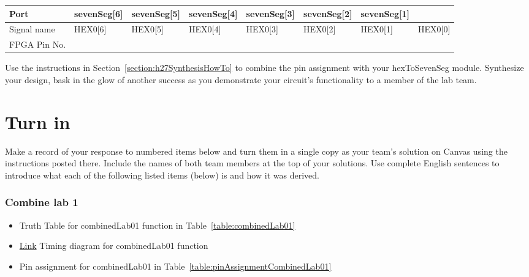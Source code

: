 \begin{longtable}[]{@{}
| >{\raggedright\arraybackslash}p{}|
  >{\raggedright\arraybackslash}p{}|
  >{\raggedright\arraybackslash}p{}|
  >{\raggedright\arraybackslash}p{}|
  >{\raggedright\arraybackslash}p{}|
  >{\raggedright\arraybackslash}p{}|
  >{\raggedright\arraybackslash}p{}|
  >{\raggedright\arraybackslash}p{}|@{}}
\toprule()
Port &
sevenSeg{[}6{]} &
sevenSeg{[}5{]} &
sevenSeg{[}4{]} &
sevenSeg{[}3{]} &
sevenSeg{[}2{]} &
sevenSeg{[}1{]} \\ \hline
\midrule()
\endhead
Signal name & HEX0{[}6{]} & HEX0{[}5{]} & HEX0{[}4{]} & HEX0{[}3{]} &
HEX0{[}2{]} & HEX0{[}1{]} & HEX0{[}0{]} \\ \hline
FPGA Pin No. & & & & & & & \\ \hline
\bottomrule()

\end{longtable}
Use the instructions in Section~\ref{section:h27SynthesisHowTo} to
combine the pin assignment with your hexToSevenSeg module.
Synthesize your design, bask in the glow of another success as you 
demonstrate your circuit's functionality to a member of the lab team.


\section{Turn in}

Make a record of your response to numbered items below and turn them in
a single copy as your team's solution on Canvas using the instructions
posted there. Include the names of both team members at the top of your
solutions. Use complete English sentences to introduce what each of the
following listed items (below) is and how it was derived.

\subsubsection{Combine lab 1} 
\begin{itemize}
\item Truth Table for combinedLab01 function in Table~\ref{table:combinedLab01}
\item \protect\hyperlink{CombinedLab01_Waveform}{Link} Timing diagram for combinedLab01 function
\item  Pin assignment for combinedLab01 in Table~\ref{table:pinAssignmentCombinedLab01}
\end{itemize}

